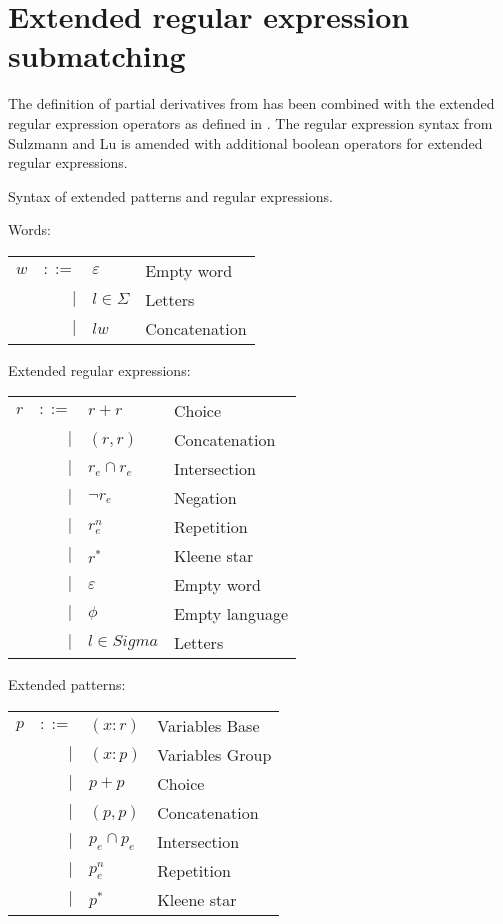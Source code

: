 \section{Extended regular expression submatching}
\label{ere-submatch}

The definition of partial derivatives from \cite{pd-pat} has been combined
with the extended regular expression operators as defined in \cite{pd-ere}.
The regular expression syntax from Sulzmann and Lu is amended with additional
boolean operators for extended regular expressions.

\begin{defn}
   \label{defn-syn}
   Syntax of extended patterns and regular expressions.

   Words:

   \begin{tabular}{lrll}
      $w$	& $::=$	& $\varepsilon$		& Empty word	\\
		& $|$	& $l \in \Sigma$	& Letters	\\
		& $|$	& $lw$			& Concatenation	\\
   \end{tabular}

   Extended regular expressions:

   \begin{tabular}{lrll}
      $r$	& $::=$	& $r+r$				& Choice		\\
		& $|$	& $(r,r)$			& Concatenation		\\
		& $|$	& $r_e \cap r_e$		& Intersection		\\
        	& $|$	& $\neg r_e$			& Negation		\\
        	& $|$	& $r_e^n$			& Repetition		\\
		& $|$	& $r^*$				& Kleene star		\\
		& $|$	& $\varepsilon$			& Empty word		\\
		& $|$	& $\phi$			& Empty language	\\
		& $|$	& $l \in Sigma$			& Letters		\\
   \end{tabular}

   Extended patterns:

   \begin{tabular}{lrll}
      $p$	& $::=$	& $(x:r)$			& Variables Base	\\
		& $|$	& $(x:p)$			& Variables Group	\\
		& $|$	& $p+p$				& Choice		\\
		& $|$	& $(p,p)$			& Concatenation		\\
		& $|$	& $p_e \cap p_e$		& Intersection		\\
        	& $|$	& $p_e^n$			& Repetition		\\
		& $|$	& $p^*$				& Kleene star		\\
   \end{tabular}
\end{defn}


